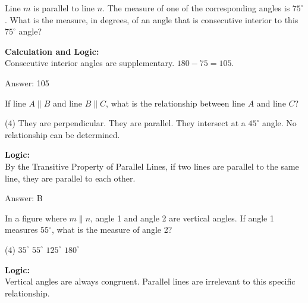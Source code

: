 \documentclass[11pt,paper=a4,answers]{exam}
\begin{document}
\begin{questions}
\question
Line $m$ is parallel to line $n$. The measure of one of the corresponding angles is $75^\circ$. What is the measure, in degrees, of an angle that is consecutive interior to this $75^\circ$ angle?

\begin{solution}
\textbf{Calculation and Logic:} \\
Consecutive interior angles are supplementary. $180 - 75 = 105$.

\vspace{30pt}

Answer: \colorbox{yellow!100}{105}
\end{solution}

\vspace{60pt}

\question
If line $A \parallel B$ and line $B \parallel C$, what is the relationship between line $A$ and line $C$?
\begin{tasks}(4)
    \task They are perpendicular.
    \task They are parallel.
    \task They intersect at a $45^\circ$ angle.
    \task No relationship can be determined.
\end{tasks}

\begin{solution}
\textbf{Logic:} \\
By the Transitive Property of Parallel Lines, if two lines are parallel to the same line, they are parallel to each other.

\vspace{30pt}

Answer: \colorbox{yellow!100}{B}
\end{solution}

\vspace{60pt}

\question
In a figure where $m \parallel n$, angle 1 and angle 2 are vertical angles. If angle 1 measures $55^\circ$, what is the measure of angle 2?
\begin{tasks}(4)
    \task $35^\circ$
    \task $55^\circ$
    \task $125^\circ$
    \task $180^\circ$
\end{tasks}

\begin{solution}
\textbf{Logic:} \\
Vertical angles are always congruent. Parallel lines are irrelevant to this specific relationship.


\end{solution}
\end{questions}
\end{document}
